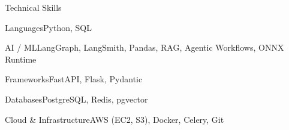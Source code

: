\documentclass[
	11pt
]{../../../template}
\begin{document}
	\begin{rSection}{T}{echnical Skills}
		\begin{rSet}{Languages}{Python, SQL}
		\end{rSet}
		\begin{rSet}{AI / ML}{LangGraph, LangSmith, Pandas, RAG, Agentic Workflows, ONNX Runtime}
		\end{rSet}
		\begin{rSet}{Frameworks}{FastAPI, Flask, Pydantic}
		\end{rSet}
		\begin{rSet}{Databases}{PostgreSQL, Redis, pgvector}
		\end{rSet}
		\begin{rSet}{Cloud \& Infrastructure}{AWS (EC2, S3), Docker, Celery, Git}
		\end{rSet}
	\end{rSection}
\end{document}
